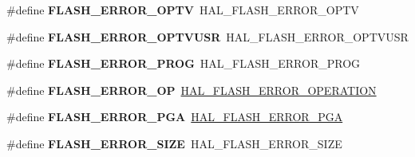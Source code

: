 \begin{DoxyCompactItemize}
\item 
\#define {\bfseries F\+L\+A\+S\+H\+\_\+\+E\+R\+R\+O\+R\+\_\+\+O\+P\+TV}~H\+A\+L\+\_\+\+F\+L\+A\+S\+H\+\_\+\+E\+R\+R\+O\+R\+\_\+\+O\+P\+TV\hypertarget{group___h_a_l___f_l_a_s_h___aliased___defines_ga88b48ae21a2c56004f16cf62246aa411}{}\label{group___h_a_l___f_l_a_s_h___aliased___defines_ga88b48ae21a2c56004f16cf62246aa411}

\item 
\#define {\bfseries F\+L\+A\+S\+H\+\_\+\+E\+R\+R\+O\+R\+\_\+\+O\+P\+T\+V\+U\+SR}~H\+A\+L\+\_\+\+F\+L\+A\+S\+H\+\_\+\+E\+R\+R\+O\+R\+\_\+\+O\+P\+T\+V\+U\+SR\hypertarget{group___h_a_l___f_l_a_s_h___aliased___defines_ga6bcc50c3baf4770eab5bb4bb6c8ca505}{}\label{group___h_a_l___f_l_a_s_h___aliased___defines_ga6bcc50c3baf4770eab5bb4bb6c8ca505}

\item 
\#define {\bfseries F\+L\+A\+S\+H\+\_\+\+E\+R\+R\+O\+R\+\_\+\+P\+R\+OG}~H\+A\+L\+\_\+\+F\+L\+A\+S\+H\+\_\+\+E\+R\+R\+O\+R\+\_\+\+P\+R\+OG\hypertarget{group___h_a_l___f_l_a_s_h___aliased___defines_ga737128e267cde11757448a999b907a7c}{}\label{group___h_a_l___f_l_a_s_h___aliased___defines_ga737128e267cde11757448a999b907a7c}

\item 
\#define {\bfseries F\+L\+A\+S\+H\+\_\+\+E\+R\+R\+O\+R\+\_\+\+OP}~\hyperlink{group___f_l_a_s_h___error___code_gafa1433e0ca2366478928c04244310d44}{H\+A\+L\+\_\+\+F\+L\+A\+S\+H\+\_\+\+E\+R\+R\+O\+R\+\_\+\+O\+P\+E\+R\+A\+T\+I\+ON}\hypertarget{group___h_a_l___f_l_a_s_h___aliased___defines_ga7e6bf51847569d433bdb694bdb5ac0f7}{}\label{group___h_a_l___f_l_a_s_h___aliased___defines_ga7e6bf51847569d433bdb694bdb5ac0f7}

\item 
\#define {\bfseries F\+L\+A\+S\+H\+\_\+\+E\+R\+R\+O\+R\+\_\+\+P\+GA}~\hyperlink{group___f_l_a_s_h___error___code_gad9f62b6567543610f667bce580550662}{H\+A\+L\+\_\+\+F\+L\+A\+S\+H\+\_\+\+E\+R\+R\+O\+R\+\_\+\+P\+GA}\hypertarget{group___h_a_l___f_l_a_s_h___aliased___defines_ga3e610cf7bc499ea0e7eee1380a04f42d}{}\label{group___h_a_l___f_l_a_s_h___aliased___defines_ga3e610cf7bc499ea0e7eee1380a04f42d}

\item 
\#define {\bfseries F\+L\+A\+S\+H\+\_\+\+E\+R\+R\+O\+R\+\_\+\+S\+I\+ZE}~H\+A\+L\+\_\+\+F\+L\+A\+S\+H\+\_\+\+E\+R\+R\+O\+R\+\_\+\+S\+I\+ZE\hypertarget{group___h_a_l___f_l_a_s_h___aliased___defines_gac056ad0617d3beaf8cf2ffb0c87b7266}{}\label{group___h_a_l___f_l_a_s_h___aliased___defines_gac056ad0617d3beaf8cf2ffb0c87b7266}


\end{DoxyCompactItemize}

